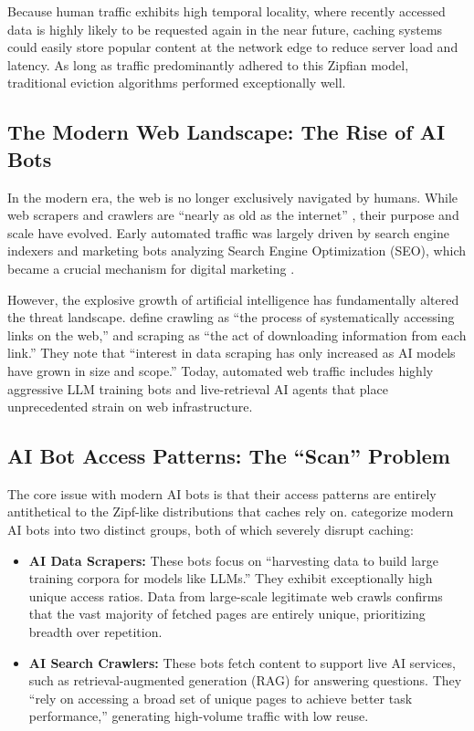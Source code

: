 Because human traffic exhibits high temporal locality, where recently accessed data is highly likely to be requested again in the near future, caching systems could easily store popular content at the network edge to reduce server load and latency. As long as traffic predominantly adhered to this Zipfian model, traditional eviction algorithms performed exceptionally well.

\subsection{The Modern Web Landscape: The Rise of AI Bots}
In the modern era, the web is no longer exclusively navigated by humans. While web scrapers and crawlers are ``nearly as old as the internet'' \cite{kim_scrapers_2025}, their purpose and scale have evolved. Early automated traffic was largely driven by search engine indexers and marketing bots analyzing Search Engine Optimization (SEO), which became a crucial mechanism for digital marketing \cite{berman_role_2012}.

However, the explosive growth of artificial intelligence has fundamentally altered the threat landscape.  define crawling as ``the process of systematically accessing links on the web,'' and scraping as ``the act of downloading information from each link.'' They note that ``interest in data scraping has only increased as AI models have grown in size and scope.'' Today, automated web traffic includes highly aggressive LLM training bots and live-retrieval AI agents that place unprecedented strain on web infrastructure.

\subsection{AI Bot Access Patterns: The ``Scan'' Problem}
The core issue with modern AI bots is that their access patterns are entirely antithetical to the Zipf-like distributions that caches rely on.  categorize modern AI bots into two distinct groups, both of which severely disrupt caching:

\begin{itemize}
    \item \textbf{AI Data Scrapers:} These bots focus on ``harvesting data to build large training corpora for models like LLMs.'' They exhibit exceptionally high unique access ratios. Data from large-scale legitimate web crawls confirms that the vast majority of fetched pages are entirely unique, prioritizing breadth over repetition.
    \item \textbf{AI Search Crawlers:} These bots fetch content to support live AI services, such as retrieval-augmented generation (RAG) for answering questions. They ``rely on accessing a broad set of unique pages to achieve better task performance,'' generating high-volume traffic with low reuse.
\end{itemize}

